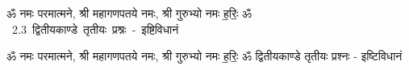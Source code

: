 \documentclass[17pt]{extarticle}
\begin{document}
\begin{titlepage}
    \begin{center}
 
\begin{sanskrit}
    { \Large
    ॐ नमः परमात्मने, श्री महागणपतये नमः, श्री गुरुभ्यो नमः
ह॒रिः॒ ॐ 
    }
    \\
    \vspace{2.5cm}
    \mbox{ \Huge
    2.3     द्वितीयकाण्डे तृतीयः प्रश्नः - इष्टिविधानं   }
\end{sanskrit}
\end{center}

\end{titlepage}
\tableofcontents

ॐ नमः परमात्मने, श्री महागणपतये नमः, श्री गुरुभ्यो नमः
ह॒रिः॒ ॐ      द्वितीयकाण्डे तृतीयः प्रश्नः - इष्टिविधानं \newline

\end{document}
